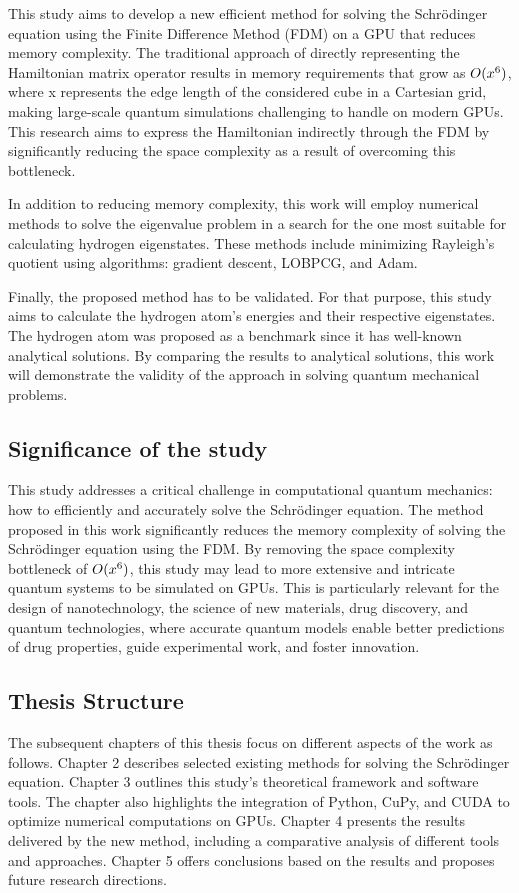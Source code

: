 This study aims to develop a new efficient method for solving the Schrödinger equation using the Finite Difference Method (FDM) on a GPU that reduces memory complexity. The traditional approach of directly representing the Hamiltonian matrix operator results in memory requirements that grow as $O(x\textsuperscript{6})$, where x represents the edge length of the considered cube in a Cartesian grid, making large-scale quantum simulations challenging to handle on modern GPUs. This research aims to express the Hamiltonian indirectly through the FDM by significantly reducing the space complexity as a result of overcoming this bottleneck.

In addition to reducing memory complexity, this work will employ numerical methods to solve the eigenvalue problem in a search for the one most suitable for calculating hydrogen eigenstates. These methods include minimizing Rayleigh's quotient using algorithms: gradient descent, LOBPCG, and Adam.

Finally, the proposed method has to be validated. For that purpose, this study aims to calculate the hydrogen atom's energies and their respective eigenstates. The hydrogen atom was proposed as a benchmark since it has well-known analytical solutions. By comparing the results to analytical solutions, this work will demonstrate the validity of the approach in solving quantum mechanical problems.

\subsection{Significance of the study}

This study addresses a critical challenge in computational quantum mechanics: how to efficiently and accurately solve the Schrödinger equation. The method proposed in this work significantly reduces the memory complexity of solving the Schrödinger equation using the FDM. By removing the space complexity bottleneck of $O(x\textsuperscript{6})$, this study may lead to more extensive and intricate quantum systems to be simulated on GPUs. This is particularly relevant for the design of nanotechnology, the science of new materials, drug discovery, and quantum technologies, where accurate quantum models enable better predictions of drug properties, guide experimental work, and foster innovation.

\subsection{Thesis Structure}

The subsequent chapters of this thesis focus on different aspects of the work as follows. Chapter 2 describes selected existing methods for solving the Schrödinger equation. Chapter 3 outlines this study's theoretical framework and software tools. The chapter also highlights the integration of Python, CuPy, and CUDA to optimize numerical computations on GPUs. Chapter 4 presents the results delivered by the new method, including a comparative analysis of different tools and approaches. Chapter 5 offers conclusions based on the results and proposes future research directions.
